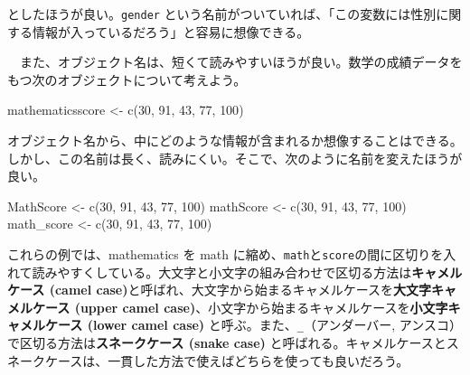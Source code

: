 \documentclass[
  a4paper,
  pandoc,
  ja=standard,
  jafont=haranoaji]{bxjsbook}
\newenvironment{Shaded}{\begin{snugshade}}{\end{snugshade}}
\newcommand{\DecValTok}[1]{\textcolor[rgb]{0.68,0.00,0.00}{#1}}
\newcommand{\FunctionTok}[1]{\textcolor[rgb]{0.28,0.35,0.67}{#1}}
\newcommand{\NormalTok}[1]{\textcolor[rgb]{0.00,0.48,0.65}{#1}}
\newcommand{\OtherTok}[1]{\textcolor[rgb]{0.00,0.48,0.65}{#1}}
\begin{document}
としたほうが良い。\texttt{gender}
という名前がついていれば、「この変数には性別に関する情報が入っているだろう」と容易に想像できる。

　また、オブジェクト名は、短くて読みやすいほうが良い。数学の成績データをもつ次のオブジェクトについて考えよう。

\begin{Shaded}
\begin{Highlighting}[numbers=left,,]
\NormalTok{mathematicsscore }\OtherTok{\textless{}{-}} \FunctionTok{c}\NormalTok{(}\DecValTok{30}\NormalTok{, }\DecValTok{91}\NormalTok{, }\DecValTok{43}\NormalTok{, }\DecValTok{77}\NormalTok{, }\DecValTok{100}\NormalTok{)}
\end{Highlighting}
\end{Shaded}

オブジェクト名から、中にどのような情報が含まれるか想像することはできる。しかし、この名前は長く、読みにくい。そこで、次のように名前を変えたほうが良い。

\begin{Shaded}
\begin{Highlighting}[numbers=left,,]
\NormalTok{MathScore  }\OtherTok{\textless{}{-}} \FunctionTok{c}\NormalTok{(}\DecValTok{30}\NormalTok{, }\DecValTok{91}\NormalTok{, }\DecValTok{43}\NormalTok{, }\DecValTok{77}\NormalTok{, }\DecValTok{100}\NormalTok{)}
\NormalTok{mathScore  }\OtherTok{\textless{}{-}} \FunctionTok{c}\NormalTok{(}\DecValTok{30}\NormalTok{, }\DecValTok{91}\NormalTok{, }\DecValTok{43}\NormalTok{, }\DecValTok{77}\NormalTok{, }\DecValTok{100}\NormalTok{)}
\NormalTok{math\_score }\OtherTok{\textless{}{-}} \FunctionTok{c}\NormalTok{(}\DecValTok{30}\NormalTok{, }\DecValTok{91}\NormalTok{, }\DecValTok{43}\NormalTok{, }\DecValTok{77}\NormalTok{, }\DecValTok{100}\NormalTok{)}
\end{Highlighting}
\end{Shaded}

これらの例では、mathematics を math
に縮め、\texttt{math}と\texttt{score}の間に区切りを入れて読みやすくしている。大文字と小文字の組み合わせで区切る方法は\textbf{キャメルケース
(camel
case)}と呼ばれ、大文字から始まるキャメルケースを\textbf{大文字キャメルケース
(upper camel
case)}、小文字から始まるキャメルケースを\textbf{小文字キャメルケース
(lower camel case)} と呼ぶ。また、\texttt{\_}（アンダーバー, アンスコ）
で区切る方法は\textbf{スネークケース (snake case)}
と呼ばれる。キャメルケースとスネークケースは、一貫した方法で使えばどちらを使っても良いだろう。
\end{document}

